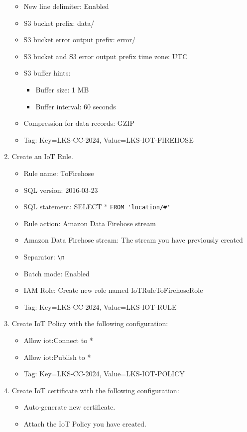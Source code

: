 \documentclass{article}
\begin{document}
\begin{enumerate}
\begin{itemize}
    \item New line delimiter: Enabled
    \item S3 bucket prefix: data/
    \item S3 bucket error output prefix: error/
    \item S3 bucket and S3 error output prefix time zone: UTC
    \item S3 buffer hints:
    \begin{itemize}
      \item Buffer size: 1 MB
      \item Buffer interval: 60 seconds
    \end{itemize}
    \item Compression for data records: GZIP
    \item Tag: Key=LKS-CC-2024, Value=LKS-IOT-FIREHOSE
  \end{itemize}
\item Create an IoT Rule.
  \begin{itemize}
    \item Rule name: ToFirehose
    \item SQL version: 2016-03-23
    \item SQL statement: SELECT * \lstinline{FROM 'location/#'}
    \item Rule action: Amazon Data Firehose stream
    \item Amazon Data Firehose stream: The stream you have previously created
    \item Separator: \lstinline{\n}
    \item Batch mode: Enabled
    \item IAM Role: Create new role named IoTRuleToFirehoseRole
    \item Tag: Key=LKS-CC-2024, Value=LKS-IOT-RULE
  \end{itemize}
\item Create IoT Policy with the following configuration:
  \begin{itemize}
    \item Allow iot:Connect to *
    \item Allow iot:Publish to *
    \item Tag: Key=LKS-CC-2024, Value=LKS-IOT-POLICY
  \end{itemize}
\item Create IoT certificate with the following configuration:
  \begin{itemize}
    \item Auto-generate new certificate.
    \item Attach the IoT Policy you have created.

\end{itemize}
\end{enumerate}
\end{document}
